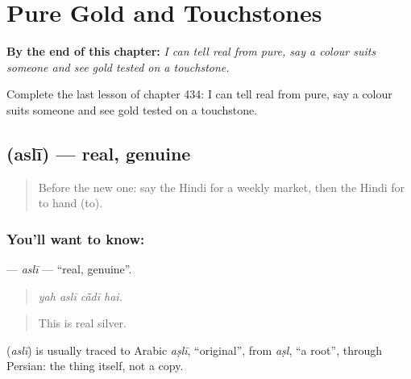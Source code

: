 
\chapter{Pure Gold and Touchstones}
\label{ch:hi-pure-gold-and-touchstones}

\begin{chapteropening}
\textbf{By the end of this chapter:} \emph{I can tell real from pure, say a colour suits someone and see gold tested on a touchstone.}

Complete the last lesson of chapter 434: I can tell real from pure, say a colour suits someone and see gold tested on a touchstone.
\end{chapteropening}

\section[\texorpdfstring{\hi{असली} (aslī)}{असली (aslī)}]{ (aslī) — real, genuine}

\label{lesson:HI-C434-asli}



\begin{quote}
Before the new one: say the Hindi for a weekly market, then the Hindi for to hand (to).
\end{quote}

\subsection*{You'll want to know: }
\textbf{} — \emph{aslī} — \textquotedblleft{}real, genuine\textquotedblright{}.

\begin{quote}
   
\end{quote}

\begin{quote}
\emph{yah aslī cā̃dī hai.}
\end{quote}

\begin{quote}
This is real silver.
\end{quote}

\begin{cousinweb}
\textbf{} (\emph{aslī}) is usually traced to Arabic \emph{aṣlī}, \textquotedblleft{}original\textquotedblright{}, from \emph{aṣl}, \textquotedblleft{}a root\textquotedblright{}, through Persian: the thing itself, not a copy.
\end{cousinweb}

